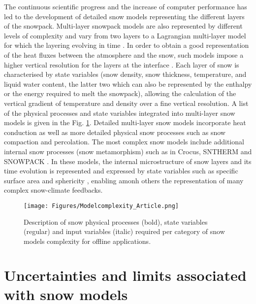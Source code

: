 \documentclass[utf8]{frontiersSCNS} %
\begin{document}
The continuous scientific progress and the increase of computer performance has led to the development of detailed snow models representing the different layers of the snowpack. Multi-layer snowpack models are also represented by different levels of complexity and vary from two layers \citep{Kondo_1990,Loth_1993,Sun_1999,Marks_1999,Yang_2003,Wang_2013,Ekici_2014} to a Lagrangian multi-layer model for which the layering evolving in time \citep{Brun_1992}. In order to obtain a good representation of the heat fluxes between the atmosphere and the snow, such models impose a higher vertical resolution for the layers at the interface \citep{Lynch_1994,Boone_2001,Decharme_2016}. Each layer of snow is characterised by state variables (snow density, snow thickness, temperature, and liquid water content, the latter two which can also be represented by the enthalpy or the energy required to melt the snowpack), allowing the calculation of the vertical gradient of temperature and density over a fine vertical resolution. A list of the physical processes and state variables integrated into multi-layer snow models is given in the Fig. \ref{Fig:Model_complexity}. Detailed multi-layer snow models incorporate heat conduction as well as more detailed physical snow processes such as snow compaction and percolation. The most complex snow models include additional internal snow processes (snow metamorphism) such as in Crocus, SNTHERM and SNOWPACK \citep{Brun_1989,Jordan_1991,Lehning_1999}. %
In these models, the internal microstructure of snow layers and its time evolution is represented and expressed by state variables such as specific surface area and sphericity \citep{Lehning_2002,Carmagnola_2014}, enabling amonh others the representation of many complex snow-climate feedbacks. 




\begin{figure}
	\centering
	\texttt{[image: Figures/Modelcomplexity\_Article.png]}
	\caption{Description of snow physical processes (bold), state variables (regular) and input variables (italic) required per category of snow models complexity for offline applications.}\label{Fig:Model_complexity}
\end{figure}


\section{Uncertainties and limits associated with snow models} 
\end{document}
